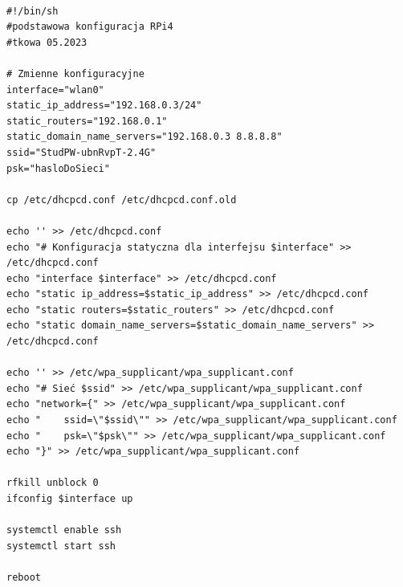 \documentclass{article}
\begin{document}
\begin{lstlisting}[caption={skrypt konfiguracyjny Paspberry Pi: \textit{basic\_config.sh}}]

#!/bin/sh
#podstawowa konfiguracja RPi4
#tkowa 05.2023

# Zmienne konfiguracyjne
interface="wlan0"
static_ip_address="192.168.0.3/24"
static_routers="192.168.0.1"
static_domain_name_servers="192.168.0.3 8.8.8.8"
ssid="StudPW-ubnRvpT-2.4G"
psk="hasloDoSieci"

cp /etc/dhcpcd.conf /etc/dhcpcd.conf.old

echo '' >> /etc/dhcpcd.conf
echo "# Konfiguracja statyczna dla interfejsu $interface" >> /etc/dhcpcd.conf
echo "interface $interface" >> /etc/dhcpcd.conf
echo "static ip_address=$static_ip_address" >> /etc/dhcpcd.conf
echo "static routers=$static_routers" >> /etc/dhcpcd.conf
echo "static domain_name_servers=$static_domain_name_servers" >> /etc/dhcpcd.conf

echo '' >> /etc/wpa_supplicant/wpa_supplicant.conf
echo "# Sieć $ssid" >> /etc/wpa_supplicant/wpa_supplicant.conf
echo "network={" >> /etc/wpa_supplicant/wpa_supplicant.conf
echo "    ssid=\"$ssid\"" >> /etc/wpa_supplicant/wpa_supplicant.conf
echo "    psk=\"$psk\"" >> /etc/wpa_supplicant/wpa_supplicant.conf
echo "}" >> /etc/wpa_supplicant/wpa_supplicant.conf

rfkill unblock 0
ifconfig $interface up

systemctl enable ssh
systemctl start ssh

reboot
\end{lstlisting}
\clearpage
\end{document}

